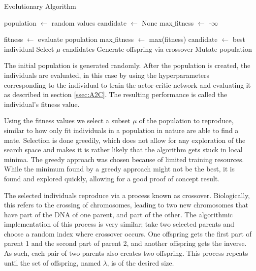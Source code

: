 \documentclass{article}
\begin{document}
\begin{algorithm}[htbp]
    \caption{Evolutionary Algorithm}
    \label{alg:EA}
    \begin{algorithmic}[1]
        \STATE population $\gets$ random values
        \STATE candidate $\gets$ None
        \STATE max$\_$fitness $\gets$ -$\infty$
        
            \STATE fitness $\gets$ evaluate population
            	\STATE max$\_$fitness $\gets$ max(fitness)
            	\STATE candidate $\gets$ best individual
            \ENDIF
            \STATE Select $\mu$ candidates
            \STATE Generate offspring via crossover
            \STATE Mutate population
        \ENDFOR        
    \end{algorithmic}
\end{algorithm}


The initial population is generated randomly.
After the population is created, the individuals are evaluated, in this case by using the hyperparameters corresponding to the individual to train the actor-critic network and evaluating it as described in section \ref{ssec:A2C}.
The resulting performance is called the individual's fitness value. 

Using the fitness values we select a subset $\mu$ of the population to reproduce, similar to how only fit individuals in a population in nature are able to find a mate.
Selection is done greedily, which does not allow for any exploration of the search space and makes it is rather likely that the algorithm gets stuck in local minima.
The greedy approach was chosen because of limited training resources.
While the minimum found by a greedy approach might not be the best, it is found and explored quickly, allowing for a good proof of concept result.

The selected individuals reproduce via a process known as crossover.
Biologically, this refers to the crossing of chromosomes, leading to two new chromosomes that have part of the DNA of one parent, and part of the other.
The algorithmic implementation of this process is very similar; take two selected parents and choose a random index where crossover occurs.
One offspring gets the first part of parent 1 and the second part of parent 2, and another offspring gets the inverse.
As such, each pair of two parents also creates two offspring.
This process repeats until the set of offspring, named $\lambda$, is of the desired size. 
\end{document}
